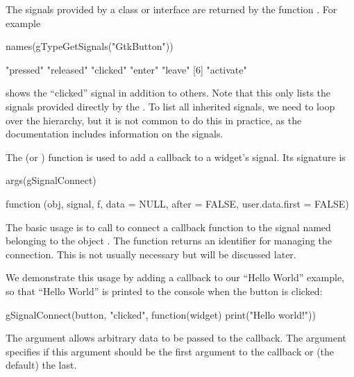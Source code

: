 The signals provided by a class or interface are returned by the
function . For example
\begin{Schunk}
\begin{Sinput}
 names(gTypeGetSignals("GtkButton"))
\end{Sinput}
\begin{Soutput}
[1] "pressed"  "released" "clicked"  "enter"    "leave"   
[6] "activate"
\end{Soutput}
\end{Schunk}
shows the ``clicked'' signal in addition to others. Note that this
only lists the signals provided directly by the . To
list all inherited signals, we need to loop over the hierarchy, but it
is not common to do this in practice, as the documentation includes
information on the signals.

The  (or ) function is used
to add a callback to a widget's signal. Its signature is
\begin{Schunk}
\begin{Sinput}
 args(gSignalConnect)
\end{Sinput}
\begin{Soutput}
function (obj, signal, f, data = NULL, after = FALSE, user.data.first = FALSE)  
\end{Soutput}
\end{Schunk}
%
The basic usage is to call  to connect a
callback function  to the signal named
 belonging to the object
. The function returns an identifier for
managing the connection. This is not usually necessary but will be
discussed later.

We demonstrate this usage by adding a callback to our ``Hello World''
example, so that ``Hello World'' is printed to the console when the
button is clicked:
\begin{Schunk}
\begin{Sinput}
 gSignalConnect(button, "clicked", 
                function(widget) print("Hello world!"))
\end{Sinput}
\end{Schunk}
%

The  argument allows arbitrary data to
be passed to the callback.  The
 argument specifies if this
 argument should be the first argument
to the callback or (the default) the last.

